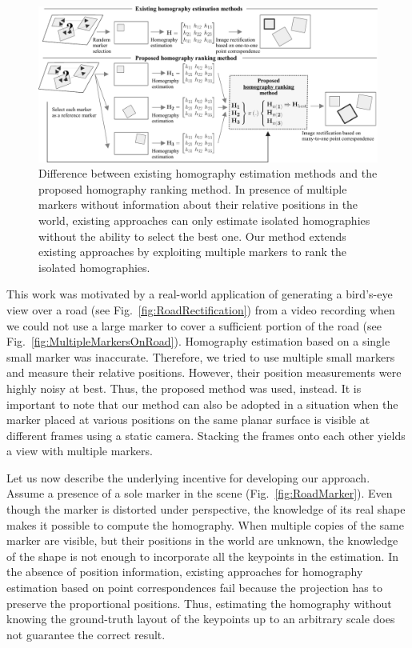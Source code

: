 \begin{figure}[t]
    \centerline{\includegraphics[width=\linewidth]{figures/methodology/homography_motivation_diagram.pdf}}
    \caption[Homography ranking motivation diagram]{Difference between existing homography estimation methods and the proposed homography ranking method. In presence of multiple markers without information about their relative positions in the world, existing approaches can only estimate isolated homographies without the ability to select the best one. Our method extends existing approaches by exploiting multiple markers to rank the isolated homographies.}
    \label{fig:HomographyMotivationDiagram}
\end{figure}

This work was motivated by a real-world application of generating a bird's-eye view over a road (see Fig.~\ref{fig:RoadRectification}) from a video recording when we could not use a large marker to cover a sufficient portion of the road (see Fig.~\ref{fig:MultipleMarkersOnRoad}). Homography estimation based on a single small marker was inaccurate. Therefore, we tried to use multiple small markers and measure their relative positions. However, their position measurements were highly noisy at best. Thus, the proposed method was used, instead. It is important to note that our method can also be adopted in a situation when the marker placed at various positions on the same planar surface is visible at different frames using a static camera. Stacking the frames onto each other yields a view with multiple markers.

Let us now describe the underlying incentive for developing our approach. Assume a presence of a sole marker in the scene (Fig.~\ref{fig:RoadMarker}). Even though the marker is distorted under perspective, the knowledge of its real shape makes it possible to compute the homography. When multiple copies of the same marker are visible, but their positions in the world are unknown, the knowledge of the shape is not enough to incorporate all the keypoints in the estimation. In the absence of position information, existing approaches for homography estimation based on point correspondences fail because the projection has to preserve the proportional positions. Thus, estimating the homography without knowing the ground-truth layout of the keypoints up to an arbitrary scale does not guarantee the correct result.

